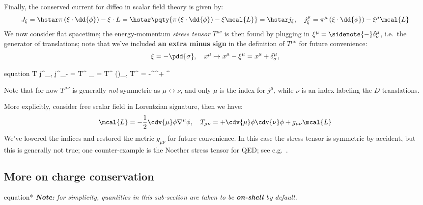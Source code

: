 \documentclass[a4paper
	,10pt
]{article}
\begin{document}
	Finally, the conserved current for diffeo in scalar field theory is given by:
	\begin{equation}
		J_\xi = \hstar \pi\,(\xi\cdot \dd{\phi})
			- \xi\cdot L
		= \hstar \pqty{
				\pi\,(\xi\cdot \dd{\phi})
				- \xi \mcal{L}
			}
		= \hstar j_\xi,
	\quad
		j_\xi^\mu = \pi^\mu\,(\xi\cdot \dd{\phi})
			- \xi^\mu \mcal{L}
	\end{equation}
	We now consider flat spacetime; the energy-momentum \textit{stress tensor} $T^{\mu\nu}$ is then found by plugging in $\xi^\mu = \sidenote{-}\delta^\mu_\nu$, i.e.~the generator of translations; note that we've included \textbf{an extra minus sign} in the definition of $T^{\mu\nu}$ for future convenience:
	\begin{equation}
		\xi = -\pdd{\sigma},
	\quad
		x^\mu \mapsto x^\mu - \xi^\mu
		= x^\mu + \delta^\mu_\sigma,
	\end{equation}
	\begin{empheq}{equation}
		T\id{^\mu_\sigma}
		\equiv j^\mu_{\sidenote{-}\pdd{\sigma}},
	\quad
		j^\mu_{-\pdd{\sigma}}
		= T^{\mu\nu} \eta_{\nu\sigma}
		= T^{\mu\nu} (\pdd{\sigma})_\nu,
	\quad
		T^{\mu\nu}
		= -\pi^\mu \pd^\nu\phi + \eta^{\mu\nu} 
	\label{eq:Noether_stress_tensor}
	\end{empheq}
	
	Note that for now $T^{\mu\nu}$ is generally \textit{not} symmetric as $\mu\leftrightarrow \nu$, and only $\mu$ is the index for $j^\mu$, while $\nu$ is an index labeling the $D$ translations. 
	
	More explicitly, consider free scalar field in Lorentzian signature, then we have:
	\begin{equation}
		\mcal{L}
		= -\frac{1}{2}
			\cdv{\mu} \phi
			\nabla^\mu \phi,
	\quad
		T_{\mu\nu}
		= +\cdv{\mu} \phi \cdv{\nu} \phi
			+ g_{\mu\nu} \mcal{L}
	\end{equation}
	We've lowered the indices and restored the metric $g_{\mu\nu}$ for future convenience. In this case the stress tensor is symmetric by accident, but this is generally not true; one counter-example is the Noether stress tensor for QED; see e.g.~\cite{Banados:2016zim}. 
\subsection{More on charge conservation}
	\vspace{-1\baselineskip}
	\begin{empheq}{equation*}
		\textsl{\textbf{Note:} for simplicity, quantities in this sub-section are taken to be \textbf{on-shell} by default. }
	\end{empheq}
	
\end{document}
